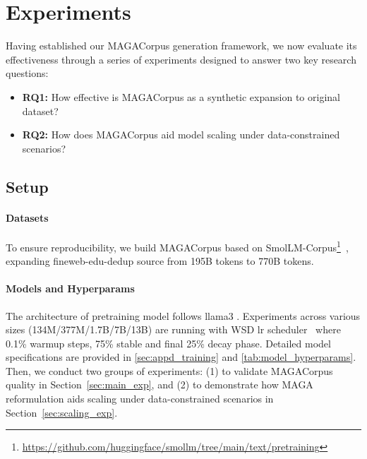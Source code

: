 \vspace{-0.5em}
\section{Experiments}
\vspace{-0.5em}
Having established our MAGACorpus generation framework, we now evaluate its effectiveness through a series of experiments designed to answer two key research questions:
\begin{itemize}[leftmargin=1.5em]
    \item \textbf{RQ1:} How effective is MAGACorpus as a synthetic expansion to original dataset?
    \item \textbf{RQ2:} How does MAGACorpus aid model scaling under data-constrained scenarios?
\end{itemize}

\subsection{Setup}
\vspace{-0.5em}
\paragraph{Datasets}
To ensure reproducibility, we build MAGACorpus based on SmolLM-Corpus\footnote{\url{https://github.com/huggingface/smollm/tree/main/text/pretraining}}~\citep{benallal2024smollmcorpus}, expanding fineweb-edu-dedup source from 195B tokens to 770B tokens.


\paragraph{Models and Hyperparams}
The architecture of pretraining model follows llama3 \citep{dubey2024llama}.
Experiments across various sizes (134M/377M/1.7B/7B/13B) are running with WSD lr scheduler~\citep{hu2024minicpm} where 0.1\% warmup steps, 75\% stable and final 25\% decay phase.
Detailed model specifications are provided in \autoref{sec:appd_training} and \autoref{tab:model_hyperparams}.
Then, we conduct two groups of experiments: 
(1) to validate MAGACorpus quality in Section~\ref{sec:main_exp}, 
and (2) to demonstrate how MAGA reformulation aids scaling under data-constrained scenarios in Section~\ref{sec:scaling_exp}.
\vspace{-0.5em}

